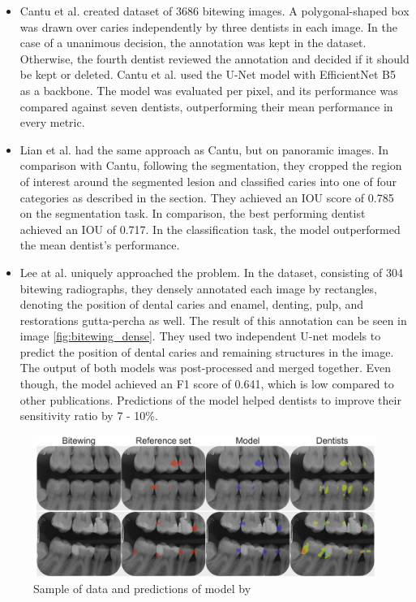 \begin{itemize}
    \item{Cantu et al. \cite{Cantu2020}} created dataset of 3686 bitewing images. A polygonal-shaped box was drawn over caries independently by three dentists in each image. In the case of a unanimous decision, the annotation was kept in the dataset. Otherwise, the fourth dentist reviewed the annotation and decided if it should be kept or deleted. Cantu et al. used the U-Net model with EfficientNet B5 as a backbone. The model was evaluated per pixel, and its performance was compared against seven dentists, outperforming their mean performance in every metric.
    \item{Lian et al. \cite{Lian2021}} had the same approach as Cantu, but on panoramic images. In comparison with Cantu, following the segmentation, they cropped the region of interest around the segmented lesion and classified caries into one of four categories as described in the section. They achieved an IOU score of 0.785 on the segmentation task. In comparison, the best performing dentist achieved an IOU of 0.717. In the classification task, the model outperformed the mean dentist's performance.
    \item {Lee at al. \cite{Lee2021}} uniquely approached the problem. In the dataset, consisting of 304 bitewing radiographs, they densely annotated each image by rectangles, denoting the position of dental caries and enamel, denting, pulp, and restorations gutta-percha as well. The result of this annotation can be seen in image \ref{fig:bitewing_dense}. They used two independent U-net models to predict the position of dental caries and remaining structures in the image. The output of both models was post-processed and merged together. Even though, the model achieved an F1 score of 0.641, which is low compared to other publications. Predictions of the model helped dentists to improve their sensitivity ratio by 7 - 10\%.
\end{itemize}

\begin{figure}
    \centering
    \includegraphics[width=\linewidth]{images/segmentatic_literature.png}
    \caption{Sample of data and predictions of model by }
    \label{fig:segmentation_lit}
\end{figure}

